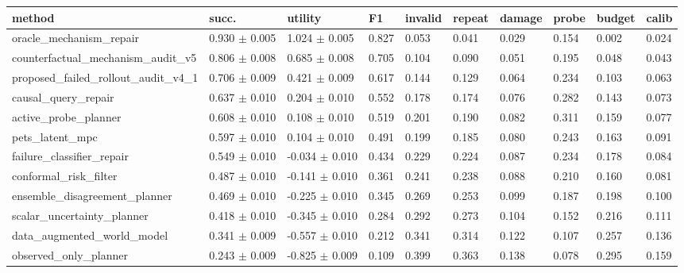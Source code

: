 \begin{tabular}{llllllllll}
\toprule
method & succ. & utility & F1 & invalid & repeat & damage & probe & budget & calib \\
\midrule
oracle\_mechanism\_repair & 0.930 $\pm$ 0.005 & 1.024 $\pm$ 0.005 & 0.827 & 0.053 & 0.041 & 0.029 & 0.154 & 0.002 & 0.024 \\
counterfactual\_mechanism\_audit\_v5 & 0.806 $\pm$ 0.008 & 0.685 $\pm$ 0.008 & 0.705 & 0.104 & 0.090 & 0.051 & 0.195 & 0.048 & 0.043 \\
proposed\_failed\_rollout\_audit\_v4\_1 & 0.706 $\pm$ 0.009 & 0.421 $\pm$ 0.009 & 0.617 & 0.144 & 0.129 & 0.064 & 0.234 & 0.103 & 0.063 \\
causal\_query\_repair & 0.637 $\pm$ 0.010 & 0.204 $\pm$ 0.010 & 0.552 & 0.178 & 0.174 & 0.076 & 0.282 & 0.143 & 0.073 \\
active\_probe\_planner & 0.608 $\pm$ 0.010 & 0.108 $\pm$ 0.010 & 0.519 & 0.201 & 0.190 & 0.082 & 0.311 & 0.159 & 0.077 \\
pets\_latent\_mpc & 0.597 $\pm$ 0.010 & 0.104 $\pm$ 0.010 & 0.491 & 0.199 & 0.185 & 0.080 & 0.243 & 0.163 & 0.091 \\
failure\_classifier\_repair & 0.549 $\pm$ 0.010 & -0.034 $\pm$ 0.010 & 0.434 & 0.229 & 0.224 & 0.087 & 0.234 & 0.178 & 0.084 \\
conformal\_risk\_filter & 0.487 $\pm$ 0.010 & -0.141 $\pm$ 0.010 & 0.361 & 0.241 & 0.238 & 0.088 & 0.210 & 0.160 & 0.081 \\
ensemble\_disagreement\_planner & 0.469 $\pm$ 0.010 & -0.225 $\pm$ 0.010 & 0.345 & 0.269 & 0.253 & 0.099 & 0.187 & 0.198 & 0.100 \\
scalar\_uncertainty\_planner & 0.418 $\pm$ 0.010 & -0.345 $\pm$ 0.010 & 0.284 & 0.292 & 0.273 & 0.104 & 0.152 & 0.216 & 0.111 \\
data\_augmented\_world\_model & 0.341 $\pm$ 0.009 & -0.557 $\pm$ 0.010 & 0.212 & 0.341 & 0.314 & 0.122 & 0.107 & 0.257 & 0.136 \\
observed\_only\_planner & 0.243 $\pm$ 0.009 & -0.825 $\pm$ 0.009 & 0.109 & 0.399 & 0.363 & 0.138 & 0.078 & 0.295 & 0.159 \\
\bottomrule
\end{tabular}
